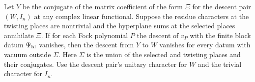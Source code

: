 \begin{lemma}
\label{lem:c-false-bottom-finite}
\emitthmsource
Let $Y$ be the conjugate of the matrix coefficient of the form $\Xi$ for the descent pair $(W,I_n)$ at any complex linear functional. Suppose the residue characters at the twisting places are nontrivial and the hyperplane sums at the selected places annihilate $\Xi$. If for each Fock polynomial $P$ the descent of $v_P$ with the finite block datum $\Psi_{\rm bl}$ vanishes, then the descent from $Y$ to $W$ vanishes for every datum with vacuum outside $\Sigma$. Here $\Sigma$ is the union of the selected and twisting places and their conjugates. Use the descent pair's unitary character for $W$ and the trivial character for $I_n$.
\end{lemma}

